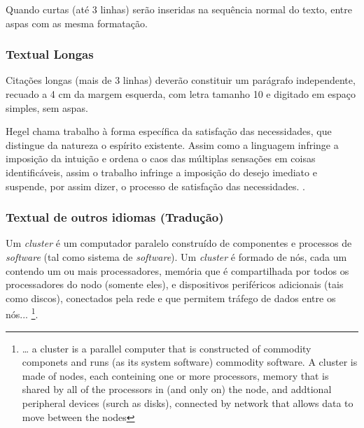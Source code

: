 Quando curtas (até 3 linhas) serão inseridas na sequência normal do texto, entre aspas com as mesma formatação.

\subsubsection{\esp Textual Longas}

Citações longas (mais de 3 linhas) deverão constituir um parágrafo independente, recuado a 4 cm da margem esquerda,
com letra tamanho 10 e digitado em espaço simples, sem aspas.
\begin{citacaodireta}
	Hegel chama trabalho à forma específica da satisfação das necessidades, que
	distingue da natureza o espírito existente. Assim como a linguagem infringe
	a imposição da intuição e ordena o caos das múltiplas sensações em coisas
	identificáveis, assim o trabalho infringe a imposição do \hspace{0.1cm}desejo \hspace{0.1cm}imediato \hspace{0.1cm}e
	suspende, por assim dizer, o processo de satisfação das necessidades.
	\cite[25]{habermas}.
\end{citacaodireta}



\subsubsection{\esp Textual de outros idiomas (Tradução)}

\begin{citacaodireta}
	Um \textit{cluster} é um computador paralelo construído de componentes e processos de \textit{software} (tal como sistema de \textit{software}).
	Um \textit{cluster} é formado de nós, cada um contendo um ou mais processadores, memória que é compartilhada por todos os processadores do nodo
	(somente eles), e dispositivos periféricos adicionais (tais como discos), conectados pela rede e que permitem tráfego de dados entre os nós...
	\cite[p. 10, tradução nossa]{groupp}\footnote {  … a cluster is a parallel computer that is constructed of commodity  componets and runs
		(as its system software) commodity software. A cluster is made of nodes, each conteining one or more processors, memory that is  shared
		by all of the processors in (and only on) the node, and addtional peripheral devices (surch as disks),
		connected by network that allows data to move between the nodes}.
\end{citacaodireta}

